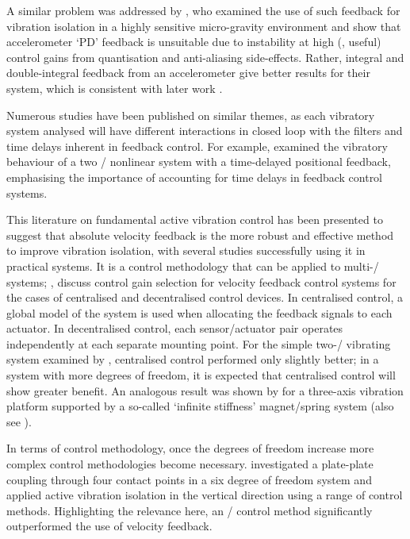 \documentclass[11pt,a4paper]{memoir}
\begin{document}
A similar problem was addressed by \textcite{zhu2006}, who examined the use of such feedback for vibration isolation in a highly sensitive micro-gravity environment and show that accelerometer `PD' feedback is unsuitable due to instability at high (\ie, useful) control gains from quantisation and anti-aliasing side-effects.
Rather, integral and double-integral feedback from an accelerometer give better results for their system, which is consistent with later work \parencite{brennan2007-jsv}.

Numerous studies have been published on similar themes, as each vibratory system analysed will have different interactions in closed loop with the filters and time delays inherent in feedback control.
For example, \textcite{zhao2007} examined the vibratory behaviour of a two \dof/ nonlinear system with a time-delayed positional feedback, emphasising the importance of accounting for time delays in feedback control systems.

This literature on fundamental active vibration control has been presented to suggest that absolute velocity feedback is the more robust and effective method to improve vibration isolation, with several studies successfully using it in practical systems.
It is a control methodology that can be applied to multi-\dof/ systems; \eg, \textcite{engels2008} discuss control gain selection for velocity feedback control systems for the cases of centralised and decentralised control devices.
In centralised control, a global model of the system is used when allocating the feedback signals to each actuator.
In decentralised control, each sensor/actuator pair operates independently at each separate mounting point.
For the simple two-\dof/ vibrating system examined by \textcite{engels2008}, centralised control performed only slightly better; in a system with more degrees of freedom, it is expected that centralised control will show greater benefit.
An analogous result was shown by \textcite{hoque2006} for a three-axis vibration platform supported by a so-called `infinite stiffness' magnet/spring system (also see ).

In terms of control methodology, once the degrees of freedom increase more complex control methodologies become necessary.
\textcite{kerber2007} investigated a plate-plate coupling through four contact points in a six degree of freedom system and applied active vibration isolation in the vertical direction using a range of control methods.
Highlighting the relevance here, an \Hinf/ control method significantly outperformed the use of velocity feedback.
\end{document}
